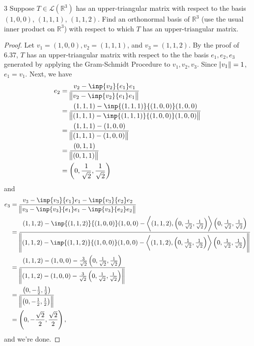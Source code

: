 \documentclass{extarticle}
\newenvironment{problem}[1]{\begin{prob*}{#1}{}}{\end{prob*}}
\newcommand{\R}{\mathbb{R}}
\newcommand{\Hom}{\mathcal{L}}
\begin{document}
\begin{problem}{3}
Suppose $T\in\Hom(\R^3)$ has an upper-triangular matrix with respect to the basis $(1, 0, 0)$, $(1, 1, 1)$, $(1, 1, 2)$.  Find an orthonormal basis of $\R^3$ (use the usual inner product on $\R^3$) with respect to which $T$ has an upper-triangular matrix.
\end{problem}
\begin{proof}
Let $v_1 = (1, 0, 0), v_2 = (1, 1, 1)$, and $v_3 = (1, 1, 2)$.  By the proof of 6.37, $T$ has an upper-triangular matrix with respect to the the basis $e_1, e_2, e_3$ generated by applying the Gram-Schmidt Procedure to $v_1, v_2, v_3$.  Since $\norm{v_1} = 1$, $e_1 = v_1$.  Next, we have
\begin{align*}
e_2 &= \frac{v_2 - \inp{v_2}{e_1} e_1}{\norm{ v_2 - \inp{v_2}{e_1} e_1}}\\
&=\frac{(1, 1, 1) - \inp{(1, 1, 1)}{(1, 0, 0)}(1, 0, 0)}{\norm{(1, 1, 1) - \inp{(1, 1, 1)}{(1, 0, 0)}(1, 0, 0)}}\\
&= \frac{(1, 1, 1) - (1, 0, 0)}{\norm{(1, 1, 1) - (1, 0, 0)}}\\
&= \frac{(0, 1, 1)}{\norm{(0, 1, 1)}}\\
&= \left(0, \frac{1}{\sqrt{2}}, \frac{1}{\sqrt{2}}\right)
\end{align*}
and
\begin{align*}
e_3 &=  \frac{v_3 - \inp{v_3}{e_1} e_1 - \inp{v_3}{e_2}e_2}{\norm{v_3 - \inp{v_3}{e_1} e_1 - \inp{v_3}{e_2}e_2}}\\
&= \frac{(1, 1, 2) - \inp{(1, 1, 2)}{(1, 0, 0)}(1, 0, 0) - \left\langle(1, 1, 2), \left(0, \frac{1}{\sqrt{2}}, \frac{1}{\sqrt{2}}\right)\right\rangle \left(0, \frac{1}{\sqrt{2}}, \frac{1}{\sqrt{2}}\right)}{\norm{(1, 1, 2) - \inp{(1, 1, 2)}{(1, 0, 0)}(1, 0, 0) - \left\langle(1, 1, 2), \left(0, \frac{1}{\sqrt{2}}, \frac{1}{\sqrt{2}}\right)\right\rangle \left(0, \frac{1}{\sqrt{2}}, \frac{1}{\sqrt{2}}\right)}}\\
&= \frac{(1, 1, 2) - (1, 0, 0) - \frac{3}{\sqrt{2}}\left(0, \frac{1}{\sqrt{2}}, \frac{1}{\sqrt{2}}\right)}{\norm{(1, 1, 2) - (1, 0, 0) - \frac{3}{\sqrt{2}}\left(0, \frac{1}{\sqrt{2}}, \frac{1}{\sqrt{2}}\right)}}\\
&= \frac{\left(0, -\frac{1}{2}, \frac{1}{2}\right)}{\norm{\left(0, -\frac{1}{2}, \frac{1}{2}\right)}}\\
&= \left(0, -\frac{\sqrt{2}}{2}, \frac{\sqrt{2}}{2}\right),
\end{align*}
and we're done.
\end{proof}
\end{document}
